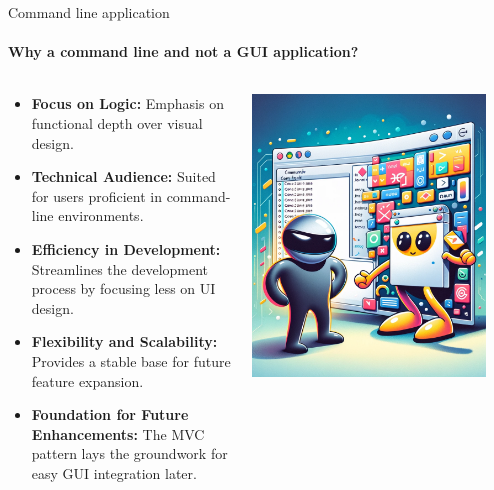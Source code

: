 \documentclass[
    ngerman,%
    authorontitle=true,
]{bfhbeamer}
\begin{document}
    
    \begin{frame}{Command line application}
    	\framesubtitle{Why a command line and not a GUI application?}
    	\begin{columns} %
    		\begin{column}{0.7\textwidth} %
    			\begin{itemize}
    				\item \textbf{Focus on Logic:} Emphasis on functional depth over visual design.
    				\item \textbf{Technical Audience:} Suited for users proficient in command-line environments.
    				\item \textbf{Efficiency in Development:} Streamlines the development process by focusing less on UI design.
    				\item \textbf{Flexibility and Scalability:} Provides a stable base for future feature expansion.
    				\item \textbf{Foundation for Future Enhancements:} The MVC pattern lays the groundwork for easy GUI integration later.
    			\end{itemize}
    		\end{column}
    		\begin{column}{0.3\textwidth} %
	    		\begin{center}
	    			\includegraphics[width=0.9\textwidth]{pictures/final_presentation/cmd_vs_gui.png}

\end{center}
\end{column}
\end{columns}
\end{frame}
\end{document}
